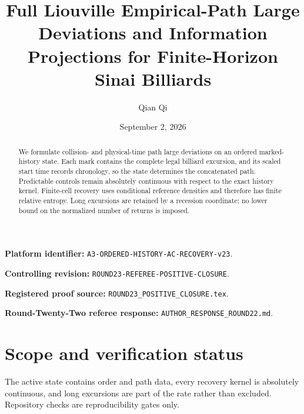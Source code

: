 \documentclass[11pt,reqno]{amsart}
\title[Full Liouville empirical-path large deviations]{Full Liouville Empirical-Path Large Deviations and Information Projections for Finite-Horizon Sinai Billiards}
\author{Qian Qi}
\date{September 2, 2026}
\theoremstyle{definition}
\theoremstyle{remark}
\begin{document}
\raggedbottom
\begin{abstract}
We formulate collision- and physical-time path large deviations on an ordered
marked-history state. Each mark contains the complete legal billiard
excursion, and its scaled start time records chronology, so the state
determines the concatenated path. Predictable controls remain absolutely
continuous with respect to the exact history kernel. Finite-cell recovery
uses conditional reference densities and therefore has finite relative
entropy. Long excursions are retained by a recession coordinate; no lower
bound on the normalized number of returns is imposed.
\end{abstract}
\maketitle
\noindent\textbf{Platform identifier:} \texttt{A3-ORDERED-HISTORY-AC-RECOVERY-v23}.\par
\noindent\textbf{Controlling revision:} \texttt{ROUND23-REFEREE-POSITIVE-CLOSURE}.\par
\noindent\textbf{Registered proof source:} \texttt{ROUND23\_POSITIVE\_CLOSURE.tex}.\par
\noindent\textbf{Round-Twenty-Two referee response:} \texttt{AUTHOR\_RESPONSE\_ROUND22.md}.\par
\tableofcontents

\section*{Scope and verification status}
The active state contains order and path data, every recovery kernel is
absolutely continuous, and long excursions are part of the rate rather than
excluded. Repository checks are reproducibility gates only.
\printbibliography
\end{document}

